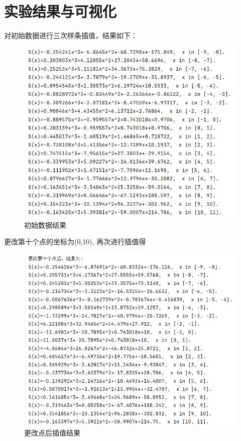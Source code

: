 \documentclass[12pt,a4paper,oneside]{article}
\begin{document}
\section{实验结果与可视化}
对初始数据进行三次样条插值，结果如下：
\begin{figure}[H]
    \centering
    \includegraphics[scale = 0.8]{figs/res1.png}
    \caption{初始数据结果}
\end{figure}
更改第十个点的坐标为(0,10), 再次进行插值得
\begin{figure}[H]
    \centering
    \includegraphics[scale = 0.8]{figs/res2.png}
    \caption{更改点后插值结果}
\end{figure}
\end{document}
